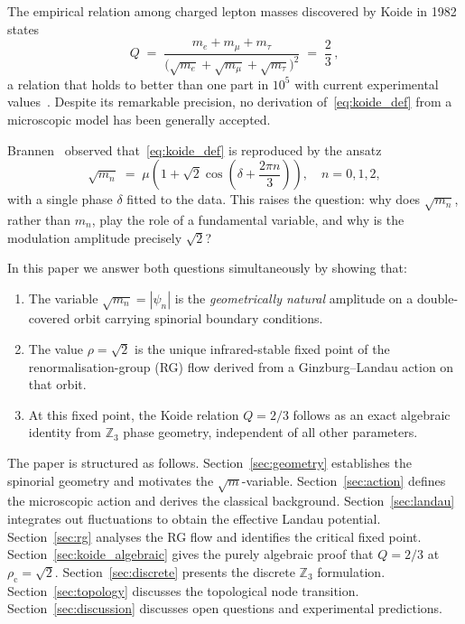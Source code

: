 \documentclass[12pt,a4paper]{article}
\theoremstyle{definition}
\newcommand{\rhoc}{\rho_{\mathrm{c}}}
\begin{document}
The empirical relation among charged lepton masses discovered by Koide in 1982
\cite{Koide1982} states
\begin{equation}
  \label{eq:koide_def}
  Q \;=\; \frac{m_e + m_\mu + m_\tau}{\bigl(\sqrt{m_e}+\sqrt{m_\mu}+\sqrt{m_\tau}\bigr)^2}
  \;=\; \frac{2}{3}\,,
\end{equation}
a relation that holds to better than one part in $10^5$ with current experimental
values~\cite{PDG2024}.
Despite its remarkable precision, no derivation of~\eqref{eq:koide_def} from a
microscopic model has been generally accepted.

Brannen~\cite{Brannen2006} observed that~\eqref{eq:koide_def} is reproduced by the ansatz
\begin{equation}
  \label{eq:brannen}
  \sqrt{m_n} \;=\; \mu\!\left(1 + \sqrt{2}\cos\!\left(\delta + \frac{2\pi n}{3}\right)\right),
  \quad n = 0,1,2,
\end{equation}
with a single phase $\delta$ fitted to the data.
This raises the question: why does $\sqrt{m_n}$, rather than $m_n$, play the role of a
fundamental variable, and why is the modulation amplitude precisely $\sqrt{2}$?

In this paper we answer both questions simultaneously by showing that:
\begin{enumerate}[label=(\roman*)]
  \item The variable $\sqrt{m_n} = |\psi_n|$ is the \emph{geometrically natural} amplitude
        on a double-covered orbit carrying spinorial boundary conditions.
  \item The value $\rho = \sqrt{2}$ is the unique infrared-stable fixed point of the
        renormalisation-group (RG) flow derived from a Ginzburg--Landau action on that orbit.
  \item At this fixed point, the Koide relation $Q = 2/3$ follows as an exact algebraic
        identity from $\mathbb{Z}_3$ phase geometry, independent of all other parameters.
\end{enumerate}

The paper is structured as follows.
Section~\ref{sec:geometry} establishes the spinorial geometry and motivates the
$\sqrt{m}$-variable.
Section~\ref{sec:action} defines the microscopic action and derives the classical background.
Section~\ref{sec:landau} integrates out fluctuations to obtain the effective Landau potential.
Section~\ref{sec:rg} analyses the RG flow and identifies the critical fixed point.
Section~\ref{sec:koide_algebraic} gives the purely algebraic proof that $Q = 2/3$ at
$\rhoc = \sqrt{2}$.
Section~\ref{sec:discrete} presents the discrete $\mathbb{Z}_3$ formulation.
Section~\ref{sec:topology} discusses the topological node transition.
Section~\ref{sec:discussion} discusses open questions and experimental predictions.
\end{document}
